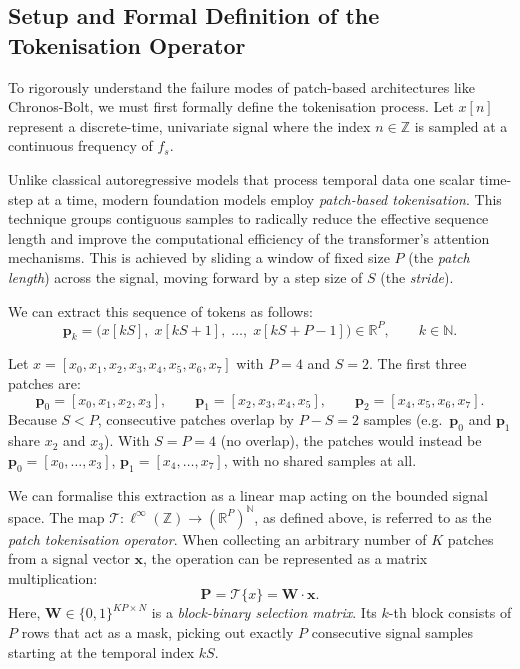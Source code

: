 \subsection{Setup and Formal Definition of the Tokenisation Operator}

To rigorously understand the failure modes of patch-based architectures like Chronos-Bolt,
we must first formally define the tokenisation process.
Let $x[n]$ represent a discrete-time, univariate signal where the index $n \in \mathbb{Z}$
is sampled at a continuous frequency of $f_s$.

Unlike classical autoregressive models that process temporal data one scalar time-step at a
time, modern foundation models employ \emph{patch-based tokenisation}.
This technique groups contiguous samples to radically reduce the effective sequence length
and improve the computational efficiency of the transformer's attention mechanisms.
This is achieved by sliding a window of fixed size $P$ (the \emph{patch length}) across the
signal, moving forward by a step size of $S$ (the \emph{stride}).

We can extract this sequence of tokens as follows:
\begin{equation}
	\mathbf{p}_k
	= \bigl(x[kS],\; x[kS+1],\; \ldots,\; x[kS+P-1]\bigr)
	\in \mathbb{R}^P,
	\qquad k \in \mathbb{N}.
\end{equation}

\begin{example}
	Let $x = [x_0, x_1, x_2, x_3, x_4, x_5, x_6, x_7]$ with $P = 4$ and $S = 2$.
	The first three patches are:
	\[
	\mathbf{p}_0 = [x_0,x_1,x_2,x_3], \qquad
	\mathbf{p}_1 = [x_2,x_3,x_4,x_5], \qquad
	\mathbf{p}_2 = [x_4,x_5,x_6,x_7].
	\]
	Because $S < P$, consecutive patches overlap by $P - S = 2$ samples
	(e.g.\ $\mathbf{p}_0$ and $\mathbf{p}_1$ share $x_2$ and $x_3$).
	With $S = P = 4$ (no overlap), the patches would instead be
	$\mathbf{p}_0{=}[x_0,\ldots,x_3]$, $\mathbf{p}_1{=}[x_4,\ldots,x_7]$,
	with no shared samples at all.
\end{example}

\begin{definition}
	We can formalise this extraction as a linear map acting on the bounded signal space.
	The map $\mathcal{T}: \ell^\infty(\mathbb{Z}) \to (\mathbb{R}^P)^{\mathbb{N}}$,
	as defined above, is referred to as the \emph{patch tokenisation operator}.
	When collecting an arbitrary number of $K$ patches from a signal vector $\mathbf{x}$,
	the operation can be represented as a matrix multiplication:
	\begin{equation}
		\mathbf{P} = \mathcal{T}\{x\} = \mathbf{W} \cdot \mathbf{x}.
	\end{equation}
	Here, $\mathbf{W} \in \{0,1\}^{KP \times N}$ is a \emph{block-binary selection matrix}.
	Its $k$-th block consists of $P$ rows that act as a mask, picking out exactly $P$
	consecutive signal samples starting at the temporal index $kS$.
\end{definition}

